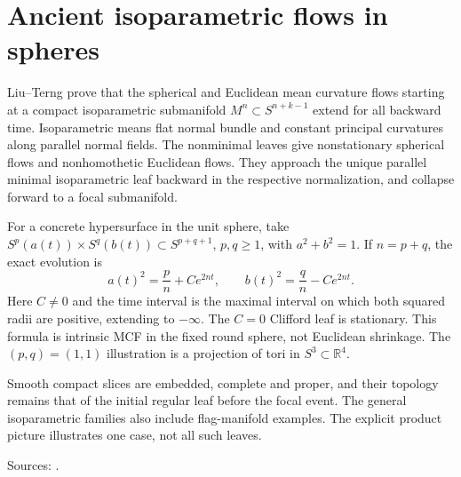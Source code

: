 \chapter{Ancient isoparametric flows in spheres}\label{sec:catalogue-isoparametric-ancient-sphere}
\begin{example}\label{ex:catalogue-isoparametric-ancient-sphere}
Liu--Terng prove that the spherical and Euclidean mean curvature flows starting at a compact isoparametric submanifold $M^n\subset S^{n+k-1}$ extend for all backward time. Isoparametric means flat normal bundle and constant principal curvatures along parallel normal fields. The nonminimal leaves give nonstationary spherical flows and nonhomothetic Euclidean flows. They approach the unique parallel minimal isoparametric leaf backward in the respective normalization, and collapse forward to a focal submanifold.

For a concrete hypersurface in the unit sphere, take $S^p(a(t))\times S^q(b(t))\subset S^{p+q+1}$, $p,q\ge1$, with $a^2+b^2=1$. If $n=p+q$, the exact evolution is
\[
 a(t)^2=\frac pn+C e^{2nt},\qquad b(t)^2=\frac qn-C e^{2nt}.
\]
Here $C\ne0$ and the time interval is the maximal interval on which both squared radii are positive, extending to $-\infty$. The $C=0$ Clifford leaf is stationary. This formula is intrinsic MCF in the fixed round sphere, not Euclidean shrinkage. The $(p,q)=(1,1)$ illustration is a projection of tori in $S^3\subset\mathbb R^4$.

Smooth compact slices are embedded, complete and proper, and their topology remains that of the initial regular leaf before the focal event. The general isoparametric families also include flag-manifold examples. The explicit product picture illustrates one case, not all such leaves.
\par Sources: \cite{CatLiuTerng2020}.
\end{example}

